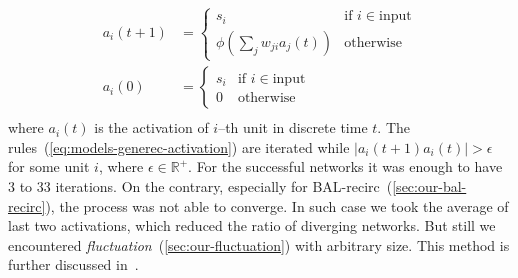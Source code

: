 \begin{align}
  \label{eq:models-generec-activation}
  a_i(t+1) &= \left\{
	\begin{array}{ll}
		s_i & \mbox{if } i \in \mbox{input} \nonumber \\
		\phi(\sum_j w_{ji}a_j(t)) & \mbox{otherwise} \nonumber 
	\end{array}
\right. \\
  a_i(0) &= \left\{
	\begin{array}{ll}
		s_i & \mbox{if } i \in \mbox{input} \nonumber \\
		0 & \mbox{otherwise} \nonumber
	\end{array}
\right. \\
\end{align} 
\label{sec:generec-fluctuation}
where $a_i(t)$ is the activation of $i$--th unit in discrete time $t$. The rules~(\ref{eq:models-generec-activation}) are iterated while $|a_i(t+1) a_i(t)| > \epsilon$ for some unit $i$, where $\epsilon \in \mathbb{R}^{+}$. For the successful networks it was enough to have 3 to 33 iterations. On the contrary, especially for BAL-recirc~(\ref{sec:our-bal-recirc}), the process was not able to converge. In such case we took the average of last two activations, which reduced the ratio of diverging networks. But still we encountered \emph{fluctuation}~(\ref{sec:our-fluctuation}) with arbitrary size. This method is further discussed in~\citet{orru2008sabio}.

